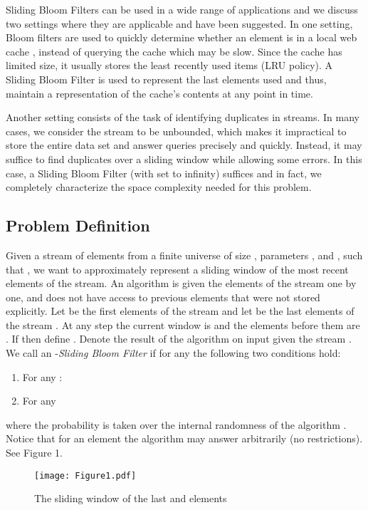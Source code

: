 \documentclass[11pt]{article}
\begin{document}
Sliding Bloom Filters can be used in a wide range of applications and we discuss two settings where they are applicable and have been suggested. In one setting, Bloom filters are used to quickly determine whether an element is in a local web cache \cite{FanCAB00}, instead of querying the cache which may be slow. Since the cache has limited size, it usually stores the least recently used items (LRU policy). A Sliding Bloom Filter is used to represent the last  elements used and thus, maintain a representation of the cache's contents at any point in time.

Another setting consists of the task of identifying duplicates in streams. In many cases, we consider the stream to be unbounded, which makes it impractical to store the entire data set and answer queries precisely and quickly. Instead, it may suffice to find duplicates over a sliding window while allowing some errors. In this case, a Sliding Bloom Filter (with  set to infinity) suffices and in fact, we completely characterize the space complexity needed for this problem.

\subsection{Problem Definition}
Given a stream of elements  from a finite universe  of size , parameters ,  and , such that , we want to approximately represent a sliding window of the  most recent elements of the stream. An algorithm  is given the elements of the stream one by one, and does not have access to previous elements that were not stored explicitly. Let  be the first  elements of the stream  and let  be the last  elements of the stream . At any step  the current window is  and the  elements before them are . If  then define . Denote  the result of the algorithm on input  given the stream . We call  an -\emph{Sliding Bloom Filter} if for any  the following two conditions hold:
\begin{enumerate}
\item For any : 
\item For any 
\end{enumerate}
where the probability is taken over the internal randomness of the algorithm . Notice that for an element  the algorithm may answer arbitrarily (no restrictions). See Figure 1.


\begin{figure}[ht!]
\centering
\texttt{[image: Figure1.pdf]}
\caption{The sliding window of the last  and  elements}
\label{overflow}
\end{figure}
\end{document}
